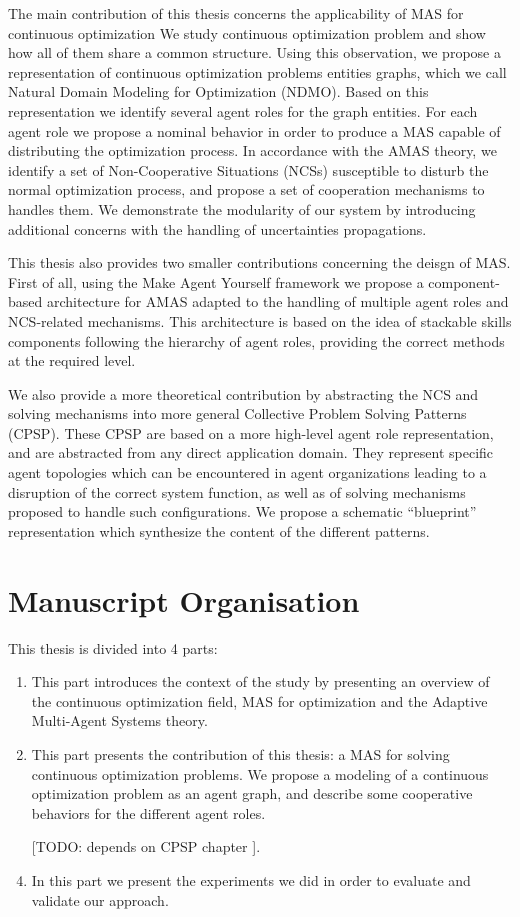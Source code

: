 The main contribution of this thesis concerns the applicability of MAS for continuous optimization We study continuous optimization problem and show how all of them share a common structure. Using this observation, we propose a representation of continuous optimization problems entities graphs, which we call Natural Domain Modeling for Optimization (NDMO). Based on this representation we identify several agent roles for the graph entities. For each agent role we propose a nominal behavior in order to produce a MAS capable of distributing the optimization process. In accordance with the AMAS theory, we identify a set of Non-Cooperative Situations (NCSs) susceptible to disturb the normal optimization process, and propose a set of cooperation mechanisms to handles them. We demonstrate the modularity of our system by introducing additional concerns with the handling of uncertainties propagations.

This thesis also provides two smaller contributions concerning the deisgn of MAS.  First of all, using the Make Agent Yourself framework  we propose a component-based architecture for AMAS adapted to the handling of multiple agent roles and NCS-related mechanisms. This architecture is based on the idea of stackable skills components following the hierarchy of agent roles, providing the correct methods at the required level.

We also provide a more theoretical contribution by abstracting the NCS and solving mechanisms into more general Collective Problem Solving Patterns (CPSP). These CPSP are based on a more high-level agent role representation, and are abstracted from any direct application domain. They represent specific agent topologies which can be encountered in agent organizations leading to a disruption of the correct system function, as well as of solving mechanisms proposed to handle such configurations. We propose a schematic \enquote{blueprint} representation which synthesize the content of the different patterns.

\section*{Manuscript Organisation}
This thesis is divided into 4 parts:
\begin{enumerate}[P{a}rt I.] %
\item This part introduces the context of the study by presenting an overview of the continuous optimization field, MAS for optimization and the Adaptive Multi-Agent Systems theory.
\item This part presents the contribution of this thesis: a MAS for solving continuous optimization problems. We propose a modeling of a continuous optimization problem as an agent graph, and describe some cooperative behaviors for the different agent roles.
\item [[TODO: depends on CPSP chapter]].
\item In this part we present the experiments we did in order to evaluate and validate our approach.
\end{enumerate}